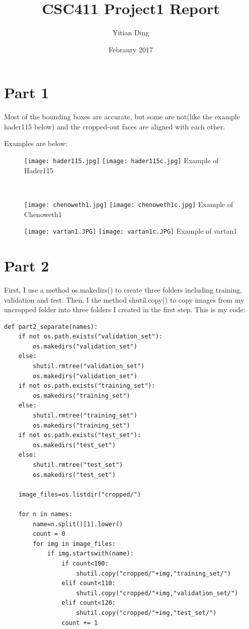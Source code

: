 \documentclass{article}
\title{CSC411 Project1 Report}
\author{Yitian Ding }
\date{Febraury 2017}
\begin{document}
\maketitle
\clearpage
\section{Part 1}
Most of the bounding boxes are accurate, but some are not(like the example hader115 below) and the cropped-out faces are aligned with each other.

Examples are below:
\begin{figure}[ht!]
  \texttt{[image: hader115.jpg]} \hfill
  \texttt{[image: hader115c.jpg]}
  \newline Example of Hader115
\end{figure}\

\begin{figure}[ht!]
  \texttt{[image: chenoweth1.jpg]} \hfill
  \texttt{[image: chenoweth1c.jpg]}
  \newline Example of Chenoweth1
\end{figure}

\begin{figure}[ht!]
  \texttt{[image: vartan1.JPG]} \hfill
  \texttt{[image: vartan1c.JPG]}
  \newline Example of vartan1
\end{figure}

\clearpage



\section{Part 2}
First, I use a method os.makedirs() to create three folders including training, validation and test. 
Then, I the method shutil.copy() to copy images from my uncropped folder into three folders I created in the first step.
This is my code:
\begin{lstlisting}
def part2_separate(names):
    if not os.path.exists("validation_set"):
        os.makedirs("validation_set")
    else:
        shutil.rmtree("validation_set")
        os.makedirs("validation_set")
    if not os.path.exists("training_set"):        
        os.makedirs("training_set")
    else:
        shutil.rmtree("training_set")
        os.makedirs("training_set")
    if not os.path.exists("test_set"):
        os.makedirs("test_set")
    else:
        shutil.rmtree("test_set")
        os.makedirs("test_set")
    
    image_files=os.listdir("cropped/")
    
    for n in names:
        name=n.split()[1].lower()
        count = 0
        for img in image_files:
            if img.startswith(name):
                if count<100:
                    shutil.copy("cropped/"+img,"training_set/")
                elif count<110:
                    shutil.copy("cropped/"+img,"validation_set/")
                elif count<120:
                    shutil.copy("cropped/"+img,"test_set/")
                count += 1

\end{lstlisting}
\end{document}
